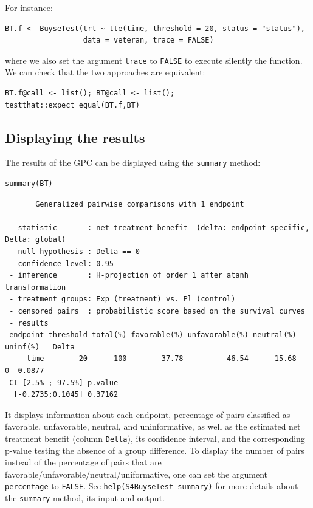 \documentclass[12pt]{article}
\begin{document}
For instance:
\lstset{language=r,label= ,caption= ,captionpos=b,numbers=none}
\begin{lstlisting}
BT.f <- BuyseTest(trt ~ tte(time, threshold = 20, status = "status"),
                  data = veteran, trace = FALSE)
\end{lstlisting}

where we also set the argument \texttt{trace} to \texttt{FALSE} to execute silently
the function. We can check that the two approaches are equivalent:
\lstset{language=r,label= ,caption= ,captionpos=b,numbers=none}
\begin{lstlisting}
BT.f@call <- list(); BT@call <- list();
testthat::expect_equal(BT.f,BT)
\end{lstlisting}

\subsection{Displaying the results}
\label{sec:orgd19a0a4}

The results of the GPC can be displayed using the \texttt{summary} method:
\lstset{language=r,label= ,caption= ,captionpos=b,numbers=none}
\begin{lstlisting}
summary(BT)
\end{lstlisting}

\begin{verbatim}
       Generalized pairwise comparisons with 1 endpoint

 - statistic       : net treatment benefit  (delta: endpoint specific, Delta: global) 
 - null hypothesis : Delta == 0 
 - confidence level: 0.95 
 - inference       : H-projection of order 1 after atanh transformation 
 - treatment groups: Exp (treatment) vs. Pl (control) 
 - censored pairs  : probabilistic score based on the survival curves
 - results
 endpoint threshold total(%) favorable(%) unfavorable(%) neutral(%) uninf(%)   Delta
     time        20      100        37.78          46.54      15.68        0 -0.0877
 CI [2.5% ; 97.5%] p.value 
  [-0.2735;0.1045] 0.37162
\end{verbatim}


It displays information about each endpoint, percentage of pairs
classified as favorable, unfavorable, neutral, and uninformative, as
well as the estimated net treatment benefit (column \texttt{Delta}), its
confidence interval, and the corresponding p-value testing the absence
of a group difference. To display the number of pairs instead of the
percentage of pairs that are
favorable/unfavorable/neutral/uniformative, one can set the argument
\texttt{percentage} to \texttt{FALSE}. See \texttt{help(S4BuyseTest-summary)} for more
details about the \texttt{summary} method, its input and output.
\end{document}
